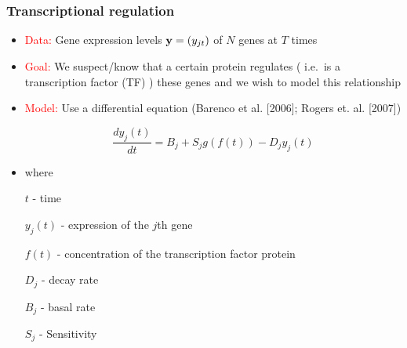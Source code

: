 \documentclass{beamer}
\begin{document}
\frame
{

\frametitle{Transcriptional regulation}

\begin{itemize}

\item \textcolor{red}{Data:} Gene expression levels $\mathbf{y} = (y_{jt})$ of $N$
      genes at $T$ times

\item \textcolor{red}{Goal:} We suspect/know that a certain protein
            regulates ( i.e.\ is a transcription factor (TF) ) these genes and we wish to model this
            relationship  
 
\item \textcolor{red}{Model:} Use a differential equation (Barenco et al. [2006];
  Rogers et. al. [2007])     

$$
\frac{d y_j (t)} {d t} =
B_j + S_j g(f(t)) - D_j y_j(t)
$$

\item where 

$t$ - time

$y_j(t)$ - expression of the $j$th gene %

$f(t)$ - concentration of the transcription factor protein 

$D_j$ - decay rate 

$B_j$ - basal rate

$S_j$ - Sensitivity 


\end{itemize}


}



%
%
%
%
%
%
%
%
%
%
%
%
%
%
\end{document}
